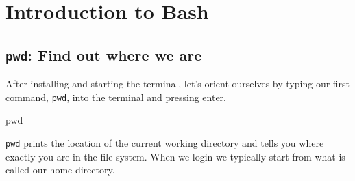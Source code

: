 \documentclass[
  letterpaper,
  DIV=11,
  numbers=noendperiod]{scrreprt}
\author{}
\date{}
\newenvironment{Shaded}{}{}
\newcommand{\BuiltInTok}[1]{\textcolor[rgb]{0.84,0.23,0.29}{#1}}
\renewcommand*\contentsname{Table of contents}
\newcommand\contentsname{Table of contents}
\begin{document}

\renewcommand*\contentsname{Table of contents}
{
\hypersetup{linkcolor=}
\setcounter{tocdepth}{2}
\tableofcontents
}
\chapter{Introduction to Bash}\label{introduction-to-bash}

\section{\texorpdfstring{\texttt{pwd}: Find out where we
are}{pwd: Find out where we are}}\label{pwd-find-out-where-we-are}

After installing and starting the terminal, let's orient ourselves by
typing our first command, \texttt{pwd}, into the terminal and pressing
enter.

\begin{Shaded}
\begin{Highlighting}[]
\BuiltInTok{pwd}
\end{Highlighting}
\end{Shaded}

\texttt{pwd} prints the location of the current working directory and
tells you where exactly you are in the file system. When we login we
typically start from what is called our home directory.
\end{document}
